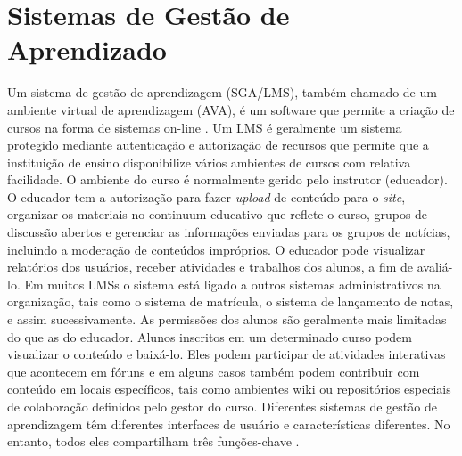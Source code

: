 \chapter{Sistemas de Gestão de Aprendizado}
\thispagestyle{empty} %

Um sistema de gestão de aprendizagem (SGA/LMS), também chamado de um ambiente virtual de aprendizagem (AVA), é um software que permite a criação de cursos na forma de sistemas on-line \cite{article:sclater}. Um LMS é geralmente um sistema protegido mediante autenticação e autorização de recursos que permite que a instituição de ensino disponibilize vários ambientes de cursos com relativa facilidade. O ambiente do curso é normalmente gerido pelo instrutor (educador). O educador tem a autorização para fazer \textit{upload} de conteúdo para o \textit{site}, organizar os materiais no continuum educativo que reflete o curso, grupos de discussão abertos e gerenciar as informações enviadas para os grupos de notícias, incluindo a moderação de conteúdos impróprios. O educador pode visualizar relatórios dos usuários, receber atividades e trabalhos dos alunos, a fim de avaliá-lo. Em muitos LMSs o sistema está ligado a outros sistemas administrativos na organização, tais como o sistema de matrícula, o sistema de lançamento de notas, e assim sucessivamente. As permissões dos alunos são geralmente mais limitadas do que as do educador. Alunos inscritos em um determinado curso podem visualizar o conteúdo e baixá-lo. Eles podem participar de atividades interativas que acontecem em fóruns e em alguns casos também podem contribuir com conteúdo em locais específicos, tais como ambientes wiki ou repositórios especiais de colaboração definidos pelo gestor do curso. Diferentes sistemas de gestão de aprendizagem têm diferentes interfaces de usuário e características diferentes. No entanto, todos eles compartilham três funções-chave \cite{website:morgan} \cite{article:coats-baldwin}.

